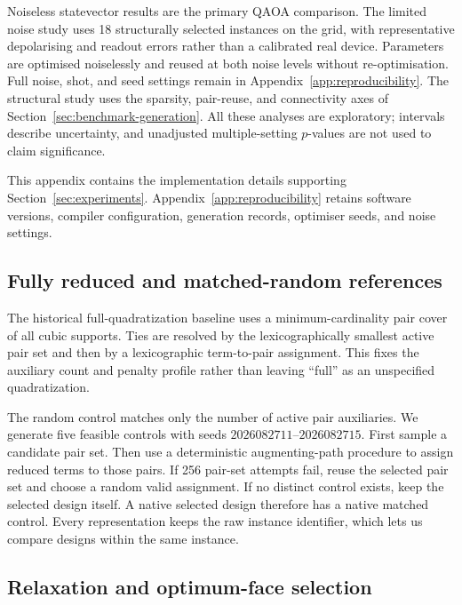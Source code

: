 \documentclass[a4paper,onecolumn,11pt,unpublished]{quantumarticle}
\theoremstyle{remark}
\begin{document}
Noiseless statevector results are the primary QAOA comparison. The limited
noise study uses 18 structurally selected instances on the grid, with
representative depolarising and readout errors rather than a calibrated real
device. Parameters are optimised noiselessly and reused at both noise levels
without re-optimisation. Full noise, shot, and seed settings remain in
Appendix~\ref{app:reproducibility}. The structural study uses the sparsity,
pair-reuse, and connectivity axes of Section~\ref{sec:benchmark-generation}.
All these analyses are exploratory; intervals describe uncertainty, and
unadjusted multiple-setting $p$-values are not used to claim significance.

This appendix contains the implementation details supporting
Section~\ref{sec:experiments}. Appendix~\ref{app:reproducibility} retains
software versions, compiler configuration, generation records, optimiser
seeds, and noise settings.

\subsection{Fully reduced and matched-random references}
\label{app:experimental-controls}

The historical full-quadratization baseline uses a minimum-cardinality pair cover of all
cubic supports.  Ties are resolved by the lexicographically smallest active
pair set and then by a lexicographic term-to-pair assignment.  This fixes the
auxiliary count and penalty profile rather than leaving ``full'' as an
unspecified quadratization.

The random control matches only the number of active pair auxiliaries.
We generate five feasible controls with seeds
$2026082711$--$2026082715$. First sample a candidate pair set. Then use a
deterministic augmenting-path procedure to assign reduced terms to those
pairs. If 256 pair-set attempts fail, reuse the selected pair set and choose
a random valid assignment. If no distinct control exists, keep the selected
design itself. A native selected design therefore has a native matched
control. Every representation keeps the raw instance identifier, which lets
us compare designs within the same instance.

\subsection{Relaxation and optimum-face selection}
\label{app:experimental-lp}
\end{document}
